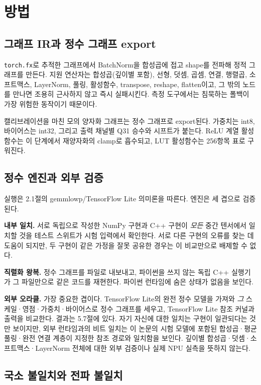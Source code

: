 \documentclass[11pt,a4paper,oneside]{report}
\begin{document}
\chapter{방법}

\section{그래프 IR과 정수 그래프 export}

\texttt{torch.fx}로 추적한 그래프에서 BatchNorm을 합성곱에 접고 shape를 전파해 정적 그래프를 만든다.
지원 연산자는 합성곱(깊이별 포함), 선형, 덧셈, 곱셈, 연결, 행렬곱, 소프트맥스, LayerNorm, 풀링,
활성함수, transpose, reshape, flatten이고, 그 밖의 노드를 만나면 조용히 근사하지 않고 즉시 실패시킨다.
측정 도구에서는 침묵하는 폴백이 가장 위험한 동작이기 때문이다.

캘리브레이션을 마친 모의 양자화 그래프는 정수 그래프로 export된다. 가중치는 int8, 바이어스는 int32, 그리고
출력 채널별 Q31 승수와 시프트가 붙는다. ReLU 계열 활성함수는 이 단계에서 재양자화의 clamp로 흡수되고,
LUT 활성함수는 256항목 표로 구워진다.

\section{정수 엔진과 외부 검증}

실행은 2.1절의 gemmlowp/TensorFlow Lite 의미론을 따른다. 엔진은 세 겹으로 검증된다.

\textbf{내부 일치.} 서로 독립으로 작성한 NumPy 구현과 C++ 구현이 \emph{모든} 중간 텐서에서 일치할 것을
테스트 스위트가 시험 입력에서 확인한다. 서로 다른 구현의 오류를 찾는 데 도움이 되지만,
두 구현이 같은 가정을 잘못 공유한 경우는 이 비교만으로 배제할 수 없다.

\textbf{직렬화 왕복.} 정수 그래프를 파일로 내보내고, 파이썬을 쓰지 않는 독립 C++ 실행기가 그 파일만으로
같은 코드를 재현한다. 파이썬 런타임에 숨은 상태가 없음을 보인다.

\textbf{외부 오라클.} 가장 중요한 겹이다. TensorFlow Lite의 완전 정수 모델을 가져와 \emph{그}
스케일·영점·가중치·바이어스로 정수 그래프를 세우고, TensorFlow Lite 참조 커널과 출력을 비교한다. 결과는
5.7절에 있다. 자기 자신에 대한 일치는 구현이 일관되다는 것만 보이지만, 외부 런타임과의 비트 일치는 이
논문의 시험 모델에 포함된 합성곱·평균 풀링·완전 연결 계층이 지정한 참조 경로와 일치함을 보인다.
깊이별 합성곱·덧셈·소프트맥스·LayerNorm 전체에 대한 외부 검증이나 실제 NPU 실측을 뜻하지 않는다.

\section{국소 불일치와 전파 불일치}
\end{document}
